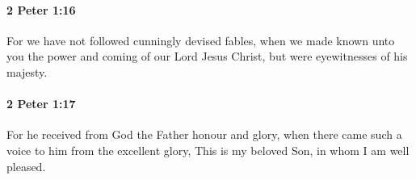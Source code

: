 		\paragraph{2 Peter 1:16} %
			\label{2PETER-1-16}

			For we have not followed cunningly devised fables, when we made known unto you the power and coming of our Lord Jesus Christ, but were eyewitnesses of his majesty.

			\begin{framed}
			\scriptsize
				\begin{compactdesc}
					\item[SBLG] 
				\end{compactdesc}
			\end{framed}

		\paragraph{2 Peter 1:17} %
			\label{2PETER-1-17}

			For he received from God the Father honour and glory, when there came such a voice to him from the excellent glory, This is my beloved Son, in whom I am well pleased.

